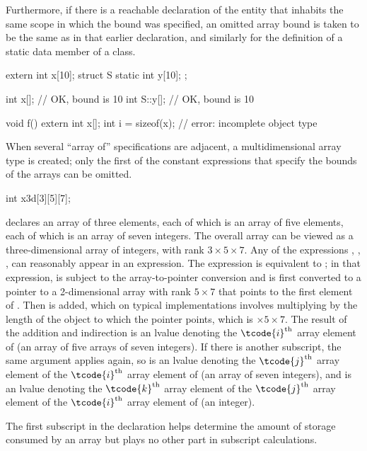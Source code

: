 \pnum
Furthermore, if there is a reachable declaration of the entity that inhabits the same
scope in which the bound was specified, an omitted array bound is taken to
be the same as in that earlier declaration, and similarly for the definition
of a static data member of a class.
\begin{example}
\begin{codeblock}
extern int x[10];
struct S {
  static int y[10];
};

int x[];                // OK, bound is 10
int S::y[];             // OK, bound is 10

void f() {
  extern int x[];
  int i = sizeof(x);    // error: incomplete object type
}
\end{codeblock}
\end{example}

\pnum
{}%
\begin{note}
When several ``array of'' specifications are adjacent,
a multidimensional array type is created;
only the first of the constant expressions
that specify the bounds of the arrays can be omitted.
\begin{example}
\begin{codeblock}
int x3d[3][5][7];
\end{codeblock}
declares an array of three elements,
each of which is an array of five elements,
each of which is an array of seven integers.
The overall array can be viewed as a
three-dimensional array of integers,
with rank $3 \times 5 \times 7$.
Any of the expressions
,
,
,
can reasonably appear in an expression.
The expression
is equivalent to
;
in that expression,
is subject to the array-to-pointer conversion
and is first converted to
a pointer to a 2-dimensional
array with rank
$5 \times 7$
that points to the first element of .
Then  is added,
which on typical implementations involves multiplying
 by the
length of the object to which the pointer points,
which is $ \times 5 \times 7$.
The result of the addition and indirection is
an lvalue denoting
the $\tcode{i}^\text{th}$ array element of
(an array of five arrays of seven integers).
If there is another subscript,
the same argument applies again, so
 is
an lvalue denoting
the $\tcode{j}^\text{th}$ array element of
the $\tcode{i}^\text{th}$ array element of
(an array of seven integers), and
 is
an lvalue denoting
the $\tcode{k}^\text{th}$ array element of
the $\tcode{j}^\text{th}$ array element of
the $\tcode{i}^\text{th}$ array element of
(an integer).
\end{example}
The first subscript in the declaration helps determine
the amount of storage consumed by an array
but plays no other part in subscript calculations.
\end{note}

